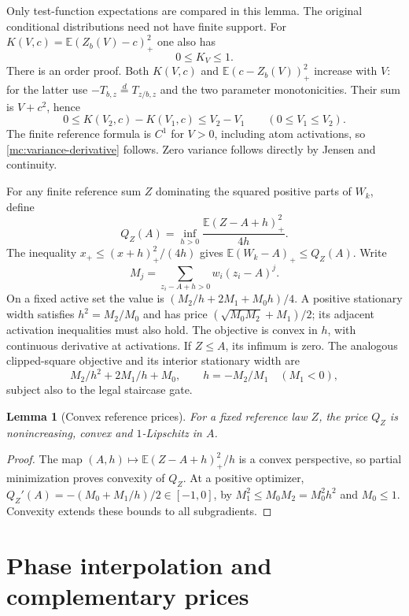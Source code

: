\documentclass[aop,preprint]{imsart}
\newtheorem{lemma}[theorem]{Lemma}
\theoremstyle{definition}
\newcommand{\E}{\mathbb E}
\numberwithin{equation}{section}
\begin{document}
Only test-function expectations are compared in this lemma.
The original conditional distributions need not have finite support.
For $K(V,c)=\E(Z_b(V)-c)_+^2$ one also has
\begin{equation}\label{mc:variance-derivative}
 0\le K_V\le1.
\end{equation}
There is an order proof. Both $K(V,c)$ and
$\E(c-Z_b(V))_+^2$ increase with $V$: for the latter use
$-T_{b,z}\overset d=T_{z/b,z}$ and the two parameter monotonicities.
Their sum is $V+c^2$, hence
\[
 0\le K(V_2,c)-K(V_1,c)\le V_2-V_1\qquad(0\le V_1\le V_2).
\]
The finite reference formula is $C^1$ for $V>0$, including atom
activations, so \eqref{mc:variance-derivative} follows.
Zero variance follows directly by Jensen and continuity.

For any finite reference sum $Z$ dominating the squared positive
parts of $W_k$, define
\begin{equation}\label{mc:Q}
 Q_Z(A)=\inf_{h>0}\frac{\E(Z-A+h)_+^2}{4h}.
\end{equation}
The inequality $x_+\le(x+h)_+^2/(4h)$ gives
$\E(W_k-A)_+\le Q_Z(A)$.
Write
\[
 M_j=\sum_{z_i-A+h>0}w_i(z_i-A)^j.
\]
On a fixed active set the value is $(M_2/h+2M_1+M_0h)/4$.
A positive stationary width satisfies $h^2=M_2/M_0$ and has
price $(\sqrt{M_0M_2}+M_1)/2$; its adjacent activation inequalities
must also hold. The objective is convex in $h$, with continuous
derivative at activations. If $Z\le A$, its infimum is zero.
The analogous clipped-square objective and its interior stationary width are
\[
 M_2/h^2+2M_1/h+M_0,\qquad h=-M_2/M_1\quad(M_1<0),
\]
subject also to the legal staircase gate.

\begin{lemma}[Convex reference prices]\label{mc:convex-prices}
For a fixed reference law $Z$, the price $Q_Z$ is nonincreasing,
convex and $1$-Lipschitz in $A$.
\end{lemma}
\begin{proof}
The map $(A,h)\mapsto\E(Z-A+h)_+^2/h$ is a convex perspective,
so partial minimization proves convexity of $Q_Z$.
At a positive optimizer,
$Q_Z'(A)=-(M_0+M_1/h)/2\in[-1,0]$, by
$M_1^2\le M_0M_2=M_0^2h^2$ and $M_0\le1$.
Convexity extends these bounds to all subgradients.
\end{proof}

\section{Phase interpolation and complementary prices}\label{pp:section}
\end{document}
